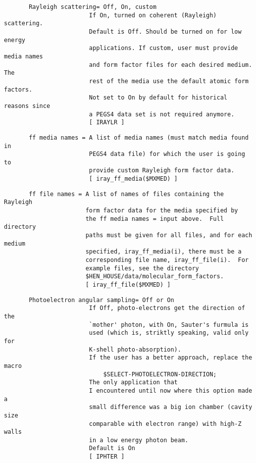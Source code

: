 \begin{verbatim}
       Rayleigh scattering= Off, On, custom
                        If On, turned on coherent (Rayleigh) scattering.
                        Default is Off. Should be turned on for low energy
                        applications. If custom, user must provide media names 
                        and form factor files for each desired medium. The
                        rest of the media use the default atomic form factors.
                        Not set to On by default for historical reasons since
                        a PEGS4 data set is not required anymore.
                        [ IRAYLR ]
\end{verbatim}
\begin{verbatim}
       ff media names = A list of media names (must match media found in 
                        PEGS4 data file) for which the user is going to
                        provide custom Rayleigh form factor data.
                        [ iray_ff_media($MXMED) ]
\end{verbatim}
\begin{verbatim}
       ff file names = A list of names of files containing the Rayleigh
                       form factor data for the media specified by
                       the ff media names = input above.  Full directory 
                       paths must be given for all files, and for each medium
                       specified, iray_ff_media(i), there must be a 
                       corresponding file name, iray_ff_file(i).  For
                       example files, see the directory 
                       $HEN_HOUSE/data/molecular_form_factors. 
                       [ iray_ff_file($MXMED) ]
\end{verbatim}
\begin{verbatim}
       Photoelectron angular sampling= Off or On
                        If Off, photo-electrons get the direction of the
                        `mother' photon, with On, Sauter's furmula is
                        used (which is, striktly speaking, valid only for
                        K-shell photo-absorption).
                        If the user has a better approach, replace the macro
                            $SELECT-PHOTOELECTRON-DIRECTION;
                        The only application that
                        I encountered until now where this option made a
                        small difference was a big ion chamber (cavity size
                        comparable with electron range) with high-Z walls
                        in a low energy photon beam.
                        Default is On
                        [ IPHTER ]
\end{verbatim}
